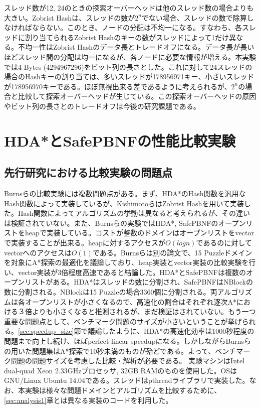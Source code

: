 \documentclass{jsarticle}
\begin{document}
% 
スレッド数が12, 24のときの探索オーバーヘッドは他のスレッド数の場合よりも大きい。Zobrist Hashは、スレッドの数が$2^n$でない場合、スレッドの数で除算しなければならない。このとき、ノードの分配は不均一になる。すなわち、各スレッドに割り当てられるZobrist Hashのキーの数がスレッドによって1だけ異なる。不均一性はZobrist Hashのデータ長とトレードオフになる。データ長が長いほどスレッド間の分配は均一になるが、各ノードに必要な情報が増える。本実験では4 Bytes (4294967296)をビット列の長さとした。これに対して24スレッドの場合のHashキーの割り当ては、多いスレッドが178956971キー、小さいスレッドが178956970キーである。ほぼ無視出来る差であるように考えられるが、$2^n$の場合と比較して探索オーバーヘッドが生じている。この探索オーバーヘッドの原因やビット列の長さとのトレードオフは今後の研究課題である。

\section{HDA*とSafePBNFの性能比較実験}
\label{sec:analysis2}

\subsection{先行研究における比較実験の問題点}

Burnsらの比較実験には複数問題点がある\cite{Burns2010}。まず、HDA*のHash関数を汎用なHash関数によって実装しているが、KishimotoらはZobrist Hashを用いて実装した。Hash関数によってアルゴリズムの挙動は異なると考えられるが、その違いは検証されていない。また、Burnsらの実験ではHDA*, SafePBNFのオープンリストをheapで実装している。コストが整数のドメインはオープンリストをvectorで実装することが出来る。heapに対するアクセスが$O(logn)$であるのに対してvectorへのアクセスは$O(1)$である。Burnsらは別の論文で、15 Puzzleドメインを対象にA*探索の最適化を議論しており、heap実装とvector実装の比較実験を行い、vector実装が3倍程度高速であると結論した\cite{Burns2012implementing}。HDA*とSafePBNFは複数のオープンリストがある。HDA*はスレッドの数に分割され、SafePBNFはNBlockの数に分割される。NBlockは15 Puzzleの場合3360個に分割される。両アルゴリズムは各オープンリストが小さくなるので、高速化の割合はそれぞれ逐次A*における３倍よりも小さくなると推測されるが、まだ検証はされていない。もう一つ重要な問題点として、ベンチマーク問題のサイズが小さいということが挙げられる。\ref{sec:speedup_size}節で議論したように、HDA*の高速化効率は1000秒程度の問題まで向上し続け、ほぼperfect linear speedupになる。しかしながらBurnsらの用いた問題集はA*探索で10秒未満のものが殆どである。よって、ベンチマーク問題の問題サイズを考慮した比較・解析が必要である。
\newline
実験マシンはIntel dual-quad Xeon 2.33GHzプロセッサ, 32GB RAMのものを使用した。OSはGNU/Linux Ubuntu 14.04である。スレッドはpthreadライブラリで実装した。なお、本実験は様々な問題ドメインとアルゴリズムを比較するために、\ref{sec:analysis1}章とは異なる実装のコードを利用した。
\end{document}
